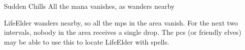 \begin{multicols}{2}
{Sudden Chills}%
{All the mana vanishes, as  wanders nearby}%

\Gls{LifeElder} wanders nearby, so all the \glspl{mp} in the area vanish.
For the next two \glspl{interval}, nobody in the \gls{area} receives a single drop.
The \glspl{pc} (or friendly elves) may be able to use this to locate \gls{LifeElder} with spells.%

\end{multicols}
